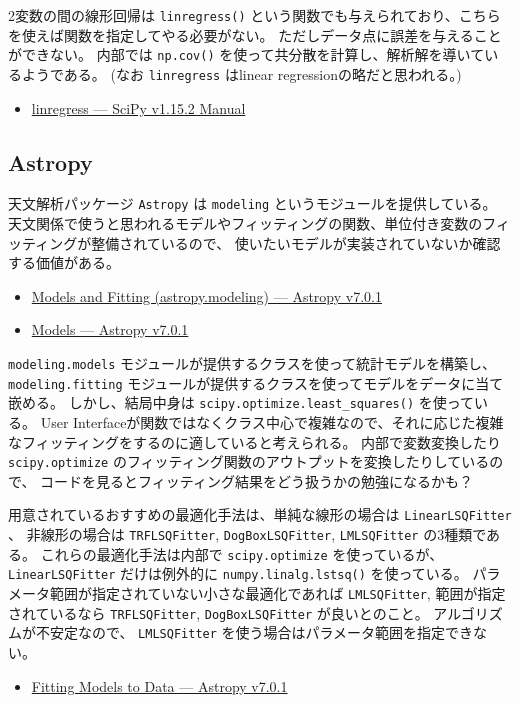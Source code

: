 \documentclass[a4paper, 8pt, notitlepage, uplatex, dvipdfmx]{jsarticle}
\begin{document}
2変数の間の線形回帰は \texttt{linregress()} という関数でも与えられており、こちらを使えば関数を指定してやる必要がない。
ただしデータ点に誤差を与えることができない。
内部では \texttt{np.cov()} を使って共分散を計算し、解析解を導いているようである。
(なお \texttt{linregress} はlinear regressionの略だと思われる。)
\begin{itemize}
\item \href{https://docs.scipy.org/doc/scipy/reference/generated/scipy.stats.linregress.html\#scipy.stats.linregress}{linregress — SciPy v1.15.2 Manual}
\end{itemize}
\subsection{Astropy}
\label{sec:org22b30ff}
天文解析パッケージ \texttt{Astropy} は \texttt{modeling} というモジュールを提供している。
天文関係で使うと思われるモデルやフィッティングの関数、単位付き変数のフィッティングが整備されているので、
使いたいモデルが実装されていないか確認する価値がある。
\begin{itemize}
\item \href{https://docs.astropy.org/en/stable/modeling/}{Models and Fitting (astropy.modeling) — Astropy v7.0.1}
\item \href{https://docs.astropy.org/en/stable/modeling/models.html}{Models — Astropy v7.0.1}
\end{itemize}

\texttt{modeling.models} モジュールが提供するクラスを使って統計モデルを構築し、
\texttt{modeling.fitting} モジュールが提供するクラスを使ってモデルをデータに当て嵌める。
しかし、結局中身は \texttt{scipy.optimize.least\_squares()} を使っている。
User Interfaceが関数ではなくクラス中心で複雑なので、それに応じた複雑なフィッティングをするのに適していると考えられる。
内部で変数変換したり \texttt{scipy.optimize} のフィッティング関数のアウトプットを変換したりしているので、
コードを見るとフィッティング結果をどう扱うかの勉強になるかも？

用意されているおすすめの最適化手法は、単純な線形の場合は \texttt{LinearLSQFitter} 、
非線形の場合は \texttt{TRFLSQFitter}, \texttt{DogBoxLSQFitter}, \texttt{LMLSQFitter} の3種類である。
これらの最適化手法は内部で \texttt{scipy.optimize} を使っているが、 \texttt{LinearLSQFitter} だけは例外的に \texttt{numpy.linalg.lstsq()} を使っている。
パラメータ範囲が指定されていない小さな最適化であれば \texttt{LMLSQFitter},
範囲が指定されているなら \texttt{TRFLSQFitter}, \texttt{DogBoxLSQFitter} が良いとのこと。
アルゴリズムが不安定なので、 \texttt{LMLSQFitter} を使う場合はパラメータ範囲を指定できない。
\begin{itemize}
\item \href{https://docs.astropy.org/en/stable/modeling/fitting.html}{Fitting Models to Data — Astropy v7.0.1}
\end{itemize}
\end{document}
